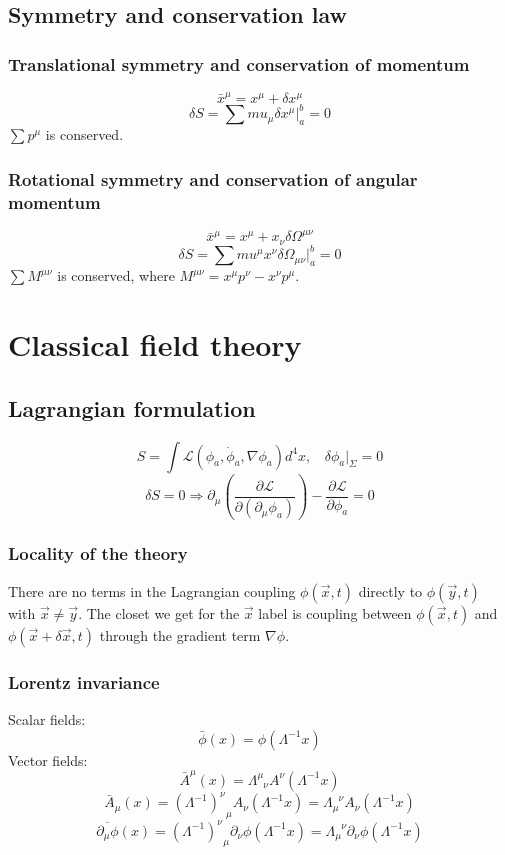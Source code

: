 \documentclass{article}
\begin{document}
\subsection{Symmetry and conservation law}
\subsubsection{Translational symmetry and conservation of momentum}
\[\bar{x}^{\mu} = x^{\mu} + \delta x^{\mu}\]
\[\delta S = \sum mu_{\mu} \delta x^{\mu}|_a^b = 0 \]
$\sum p^{\mu}$ is conserved.
\subsubsection{Rotational symmetry and conservation of angular momentum}
\[\bar{x}^{\mu} = x^{\mu} + x_{\nu}\delta \Omega^{\mu \nu}\]
\[\delta S = \sum mu^{\mu} x^{\nu} \delta \Omega_{\mu \nu}|_a^b = 0 \]
$\sum M^{\mu \nu} $ is conserved, where $M^{\mu \nu} = x^{\mu}p^{\nu} - x^{\nu}p^{\mu}$.

\section{Classical field theory}
\subsection{Lagrangian formulation}
\[S = \int \mathcal{L}(\phi_a,\dot{\phi}_a,\nabla \phi_a) d^4 x, \ \ \ \ \delta \phi_a |_{\Sigma} = 0\]
\[\delta S = 0 \Rightarrow \partial_{\mu} \left (\frac{\partial \mathcal{L}}{\partial (\partial_{\mu} \phi_a)} \right ) - \frac{\partial \mathcal{L}}{\partial \phi_a} = 0\]
\subsubsection{Locality of the theory}
There are no terms in the Lagrangian coupling $\phi(\vec{x},t)$ directly to  $\phi(\vec{y},t)$ with $\vec{x} \neq \vec{y}$. The closet we get for the $\vec{x}$ label is coupling between $\phi(\vec{x},t)$ and $\phi(\vec{x}+\delta\vec{x},t)$ through the gradient term $\nabla \phi$.
\subsubsection{Lorentz invariance}
Scalar fields:
\[\bar{\phi}(x) = \phi(\Lambda^{-1} x)\]
Vector fields:
\[\bar{A}^{\mu}(x) = \Lambda^{\mu}_{\phantom{\mu}\nu} A^{\nu}(\Lambda^{-1}x)\]
\[\bar{A}_{\mu}(x) = (\Lambda^{-1})^{\nu}_{\phantom{\mu}\mu} A_{\nu}(\Lambda^{-1}x) = \Lambda_{\mu}^{\phantom{\mu}\nu}A_{\nu}(\Lambda^{-1}x)\]
\[\overline{\partial_{\mu}\phi}(x) = (\Lambda^{-1})^{\nu}_{\phantom{\mu}\mu} \partial_{\nu} \phi (\Lambda^{-1}x) = \Lambda_{\mu}^{\phantom{\mu}\nu} \partial_{\nu} \phi (\Lambda^{-1}x)\]
\end{document}
